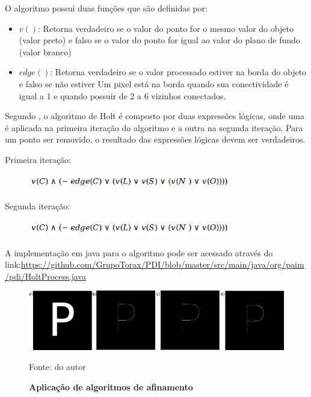 \documentclass[
	12pt,				%
	oneside,			%
	a4paper,			%
	english,			%
	french,				%
	spanish,			%
	brazil,				%
	]{abntex2}
\begin{document}
O algoritmo possui duas funções que são definidas por:

\begin{itemize}
\item \(v()\): Retorna verdadeiro se o valor do ponto for o mesmo valor do objeto (valor preto) e falso se o valor do ponto for igual ao valor do plano de fundo (valor branco)
\item \(edge()\): Retorna verdadeiro se o valor processado estiver na borda do objeto e falso se não estiver
\subitem Um pixel está na borda quando sua conectividade é igual a 1 e quando possuir de 2 a 6 vizinhos conectados. 
\end{itemize}

Segundo \citet{guilherme:2007}, o algoritmo de Holt é composto por duas expressões lógicas, onde uma é aplicada na primeira iteração do algoritmo e a outra na segunda iteração. Para um ponto ser removido, o resultado das expressões lógicas devem ser verdadeiros.

Primeira iteração: 
\begin{figure}[ht]
\centering
\includegraphics[width=0.8\textwidth]{imagens/holt_formula1.png}
\end{figure}

Segunda iteração:
\begin{figure}[ht]
\centering
\includegraphics[width=0.8\textwidth]{imagens/holt_formula1.png}
\end{figure}

A implementação em java para o algoritmo pode ser acessado através do link:\url{https://github.com/GrupoTorax/PDI/blob/master/src/main/java/org/paim/pdi/HoltProcess.java} 

\begin{figure}[ht]
\centering
\caption{\textbf{Aplicação de algoritmos de afinamento}}
\includegraphics[width=1\textwidth]{imagens/esqueletizacao.png}

Fonte: do autor
\label{fig:esqueletizacao}
\end{figure}
\end{document}
